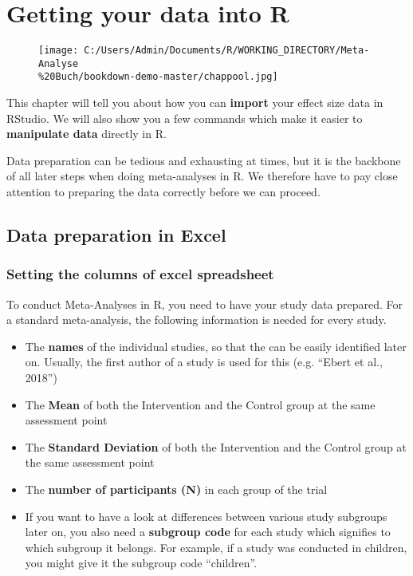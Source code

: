 \documentclass[]{book}
\providecommand{\tightlist}{%
  \setlength{\itemsep}{0pt}\setlength{\parskip}{0pt}}
\theoremstyle{definition}
\theoremstyle{definition}
\theoremstyle{definition}
\theoremstyle{remark}
\begin{document}
\chapter{Getting your data into R}\label{getting-your-data-into-r}

\begin{figure}
\centering
\texttt{[image: C:/Users/Admin/Documents/R/WORKING\_DIRECTORY/Meta-Analyse\\\%20Buch/bookdown-demo-master/chappool.jpg]}
\caption{}
\end{figure}

\begin{rmdinfo}
This chapter will tell you about how you can \textbf{import} your effect
size data in RStudio. We will also show you a few commands which make it
easier to \textbf{manipulate data} directly in R.

Data preparation can be tedious and exhausting at times, but it is the
backbone of all later steps when doing meta-analyses in R. We therefore
have to pay close attention to preparing the data correctly before we
can proceed.
\end{rmdinfo}

\section{Data preparation in Excel}\label{data-preparation-in-excel}

\hypertarget{excel_preparation}{\subsection{Setting the columns of excel
spreadsheet}\label{excel_preparation}}

To conduct Meta-Analyses in R, you need to have your study data
prepared. For a standard meta-analysis, the following information is
needed for every study.

\begin{itemize}
\tightlist
\item
  The \textbf{names} of the individual studies, so that the can be
  easily identified later on. Usually, the first author of a study is
  used for this (e.g. ``Ebert et al., 2018'')
\item
  The \textbf{Mean} of both the Intervention and the Control group at
  the same assessment point
\item
  The \textbf{Standard Deviation} of both the Intervention and the
  Control group at the same assessment point
\item
  The \textbf{number of participants (N)} in each group of the trial
\item
  If you want to have a look at differences between various study
  subgroups later on, you also need a \textbf{subgroup code} for each
  study which signifies to which subgroup it belongs. For example, if a
  study was conducted in children, you might give it the subgroup code
  ``children''.
\end{itemize}
\end{document}
